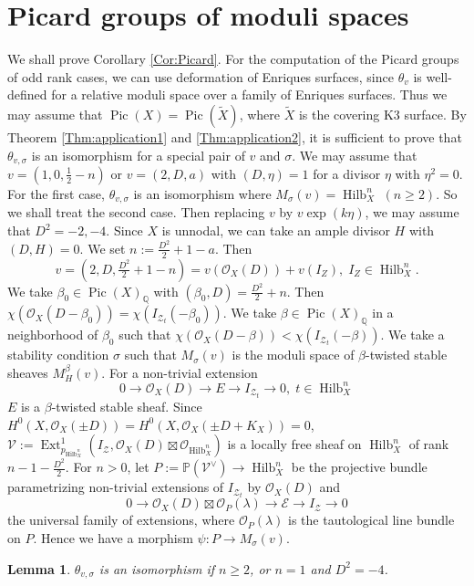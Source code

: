 \documentclass[leqno,11pt]{amsart}
\def\P{\ensuremath{\mathbb{P}}}
\def\Q{\ensuremath{\mathbb{Q}}}
\def\Ext{\mathop{\mathrm{Ext}}\nolimits}
\def\Hilb{\mathop{\mathrm{Hilb}}\nolimits}
\def\Pic{\mathop{\mathrm{Pic}}\nolimits}
\newtheorem{Lem}[Thm]{Lemma}
\theoremstyle{definition}
\def\P{\ensuremath{\mathbb{P}}}
\def\Q{\ensuremath{\mathbb{Q}}}
\def\EE{\ensuremath{\mathcal E}}
\def\OO{\ensuremath{\mathcal O}}
\def\VV{\ensuremath{\mathcal V}}
\def\ZZ{\ensuremath{\mathcal Z}}
\begin{document}
{\color{red}
\section{Picard groups of moduli spaces}

We shall prove Corollary \ref{Cor:Picard}.
For the computation of the Picard groups of odd rank cases,
we can use deformation of Enriques surfaces, since
$\theta_v$ is well-defined for a relative moduli space over
a family of Enriques surfaces.
Thus we may assume that $\Pic(X)=\Pic(\widetilde{X})$, where $\widetilde{X}$
is the covering K3 surface.
By Theorem \ref{Thm:application1} and \ref{Thm:application2}, 
it is sufficient to prove that $\theta_{v,\sigma}$ is an isomorphism 
for a special pair of $v$ and $\sigma$.
We may assume that $v=(1,0,\tfrac{1}{2}-n)$ or 
$v=(2,D,a)$ with
$(D,\eta)=1$ for a divisor $\eta$ with $\eta^2=0$.
For the first case,
$\theta_{v,\sigma}$ is an isomorphism where
$M_\sigma(v)=\Hilb_X^n$ $(n \geq 2)$.
So we shall treat the second case. 
Then replacing $v$ by $v \exp(k \eta)$, we may assume that
$D^2=-2,-4$.
Since $X$ is unnodal,
we can take an ample divisor $H$ with $(D,H)=0$.
We set $n:=\frac{D^2}{2}+1-a$.
Then 
$$
v=(2,D,\tfrac{D^2}{2}+1-n)=v(\OO_X(D))+v(I_Z),\;
I_Z \in \Hilb_X^n.
$$
We take $\beta_0 \in \Pic(X)_{\Q}$
with $(\beta_0,D)=\frac{D^2}{2}+n$.
Then $\chi(\OO_X(D-\beta_0))=\chi(I_{\ZZ_t}(-\beta_0))$.
We take $\beta  \in \Pic(X)_{\Q}$ in a neighborhood of $\beta_0$
such that $\chi(\OO_X(D-\beta))<\chi(I_{\ZZ_t}(-\beta))$.
We take a stability condition $\sigma$ such that $M_\sigma(v)$ is the 
moduli space of $\beta$-twisted stable sheaves $M_H^\beta(v)$.
For a non-trivial extension
$$
0 \to \OO_X(D) \to E \to I_{\ZZ_t} \to 0,\; t \in \Hilb_X^n
$$
$E$ is a $\beta$-twisted stable sheaf.
Since $H^0(X,\OO_X(\pm D))=H^0(X,\OO_X(\pm D+K_X))=0$,
$\VV:=\Ext^1_{p_{\Hilb_X^n}}(I_{\ZZ},\OO_X(D) \boxtimes \OO_{\Hilb_X^n})$ 
is a locally free sheaf 
on $\Hilb_X^n$ of rank $n-1-\tfrac{D^2}{2}$.
For $n>0$, let $P:=\P(\VV^{\vee}) \to \Hilb_X^n$ be the projective bundle
parametrizing non-trivial extensions
of $I_{\ZZ_t}$ by $\OO_X(D)$ and 
\begin{equation}\label{eq:beta}
0 \to \OO_X(D) \boxtimes \OO_P(\lambda) \to \EE \to
I_{\ZZ} \to 0 
\end{equation}
the universal family of extensions, where
$\OO_P(\lambda)$ is the tautological line bundle on $P$.
Hence we have a morphism 
$\psi:P \to M_\sigma(v)$.


\begin{Lem}
$\theta_{v,\sigma}$ is an isomorphism if $n \geq 2$, or $n=1$ and $D^2=-4$. 
\end{Lem}

}
\end{document}
